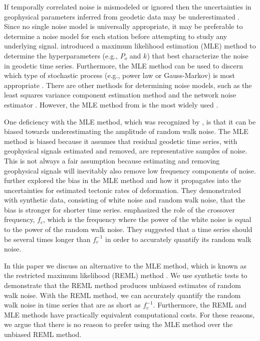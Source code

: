 If temporally correlated noise is mismodeled or ignored then the uncertainties in geophysical parameters inferred from geodetic data may be underestimated \citep[e.g.,][]{Zhang1997,Langbein2012}. Since no single noise model is universally appropriate, it may be preferable to determine a noise model for each station before attempting to study any underlying signal. \citet{Langbein1997} introduced a maximum likelihood estimation (MLE) method to determine the hyperparameters (e.g., $P_o$ and $k$) that best characterize the noise in geodetic time series. Furthermore, the MLE method can be used to discern which type of stochastic process (e.g., power law or Gauss-Markov) is most appropriate \citep{Langbein2004}. There are other methods for determining noise models, such as the least squares variance component estimation method \citep{Amiri-Simkooei2007} and the network noise estimator \citep{Dmitrieva2015}. However, the MLE method from \citet{Langbein1997} is the most widely used \citep[e.g.,][]{Langbein2004,Langbein2008,Zhang1997,Mao1999,Williams2004,Hill2009,King2009,Murray2017}.  

One deficiency with the MLE method, which was recognized by \citet{Langbein1997}, is that it can be biased towards underestimating the amplitude of random walk noise. The MLE method is biased because it assumes that residual geodetic time series, with geophysical signals estimated and removed, are representative samples of noise. This is not always a fair assumption because estimating and removing geophysical signals will inevitably also remove low frequency components of noise. \citet{Langbein2012} further explored the bias in the MLE method and how it propagates into the uncertainties for estimated tectonic rates of deformation. They demonstrated with synthetic data, consisting of white noise and random walk noise, that the bias is stronger for shorter time series. \citet{Langbein2012} emphasized the role of the crossover frequency, $f_c$, which is the frequency where the power of the white noise is equal to the power of the random walk noise. They suggested that a time series should be several times longer than $f_c^{-1}$ in order to accurately quantify its random walk noise. 

In this paper we discuss an alternative to the MLE method, which is known as the restricted maximum likelihood (REML) method \citep[e.g.,][]{Cressie1992}.  We use synthetic tests to demonstrate that the REML method produces unbiased estimates of random walk noise. With the REML method, we can accurately quantify the random walk noise in time series that are as short as $f_c^{-1}$. Furthermore, the REML and MLE methods have practically equivalent computational costs. For these reasons, we argue that there is no reason to prefer using the MLE method over the unbiased REML method. 


